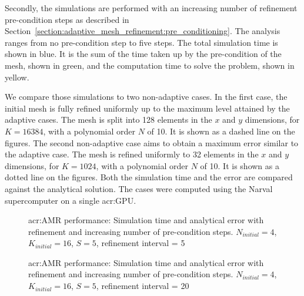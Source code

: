 Secondly, the simulations are performed with an increasing number of refinement pre-condition steps
as described in Section~\ref{section:adaptive_mesh_refinement:pre_conditioning}. The analysis ranges
from no pre-condition step to five steps. The total simulation time is shown in blue. It is the sum
of the time taken up by the pre-condition of the mesh, shown in green, and the computation time to
solve the problem, shown in yellow. 

We compare those simulations to two non-adaptive cases. In the first case, the initial mesh is fully
refined uniformly up to the maximum level attained by the adaptive cases. The mesh is split into 128
elements in the \(x\) and \(y\) dimensions, for \(K = 16384\), with a polynomial order \(N\) of 10.
It is shown as a dashed line on the figures. The second non-adaptive case aims to obtain a maximum
error similar to the adaptive case. The mesh is refined uniformly to 32 elements in the \(x\) and
\(y\) dimensions, for \(K = 1024\), with a polynomial order \(N\) of 10. It is shown as a dotted
line on the figures. Both the simulation time and the error are compared against the analytical
solution. The cases were computed using the Narval supercomputer on a single \acrshort{acr:GPU}.

\begin{figure}[H]
	\centering
	\caption{\Acrlong{acr:AMR} performance: Simulation time and analytical error with refinement and increasing number of pre-condition steps. \(N_{initial} = 4\), \(K_{initial} = 16\), \(S = 5\), refinement interval = 5}\label{fig:adaptivity_efficiency_A5}
\end{figure}

\begin{figure}[H]
	\centering
	\hfill
	\caption{\Acrlong{acr:AMR} performance: Simulation time and analytical error with refinement and increasing number of pre-condition steps. \(N_{initial} = 4\), \(K_{initial} = 16\), \(S = 5\), refinement interval = 20}\label{fig:adaptivity_efficiency_A20}
\end{figure}

